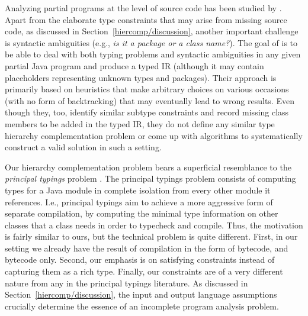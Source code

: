 Analyzing partial programs at the level of source code has been
studied by \citeauthor{oopsla/DagenaisH08}
\cite{oopsla/DagenaisH08}. Apart from the elaborate type constraints
that may arise from missing source code, as discussed in
Section~\ref{hiercomp/discussion}, another important challenge is
syntactic ambiguities (e.g., \emph{is it a package or a class
  name?}). The goal of \citeauthor{oopsla/DagenaisH08} is to be able
to deal with both typing problems and syntactic ambiguities in any
given partial Java program and produce a typed IR (although it may
contain placeholders representing unknown types and packages). Their
approach is primarily based on heuristics that make arbitrary choices
on various occasions (with no form of backtracking) that may
eventually lead to wrong results. Even though they, too, identify
similar subtype constraints and record missing class members to be
added in the typed IR, they do not define any similar type hierarchy
complementation problem or come up with algorithms to systematically
construct a valid solution in such a setting.


Our hierarchy complementation problem bears a superficial resemblance
to the \emph{principal typings} problem
\cite{popl/AnconaZ04,popl/AnconaDDZ05,Ancona04even}.  The principal
typings problem consists of computing types for a Java module in
complete isolation from every other module it references. I.e.,
principal typings aim to achieve a more aggressive form of separate
compilation, by computing the minimal type information on other
classes that a class needs in order to typecheck and compile. Thus,
the motivation is fairly similar to ours, but the technical problem is
quite different.  First, in our setting we already have the result of
compilation in the form of bytecode, and bytecode only. Second, our
emphasis is on satisfying constraints instead of capturing them as a
rich type. Finally, our constraints are of a very different nature
from any in the principal typings literature. As discussed in
Section~\ref{hiercomp/discussion}, the input and output language
assumptions crucially determine the essence of an incomplete program
analysis problem.


